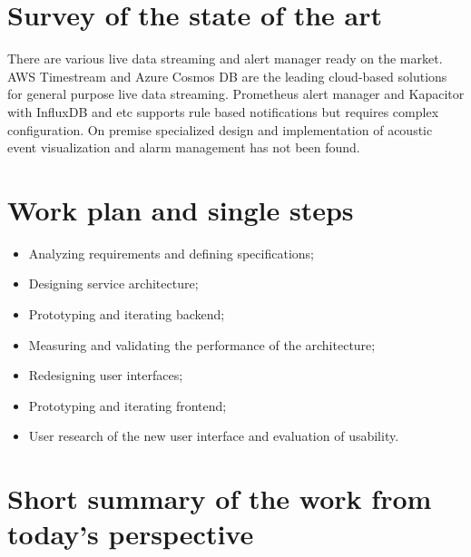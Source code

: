 \documentclass[12pt]{scrartcl}
\begin{document}
\section*{Survey of the state of the art} %

There are various live data streaming and alert manager ready on the market. AWS Timestream\cite{AWSTimestream} and Azure Cosmos DB\cite{AzureCosmos} are the leading cloud-based solutions for general purpose live data streaming. Prometheus alert manager\cite{AlertManager} and Kapacitor with InfluxDB\cite{kapacitor} and etc supports rule based notifications but requires complex configuration. On premise specialized design and implementation of acoustic event visualization and alarm management has not been found.

\section*{Work plan and single steps} %

\begin{itemize}
    \item Analyzing requirements and defining specifications;
    \item Designing service architecture;
    \item Prototyping and iterating backend;
    \item Measuring and validating the performance of the architecture;
    \item Redesigning user interfaces;
    \item Prototyping and iterating frontend;
    \item User research of the new user interface and evaluation of usability.
\end{itemize}

\section*{Short summary of the work from today’s perspective} %
\end{document}
